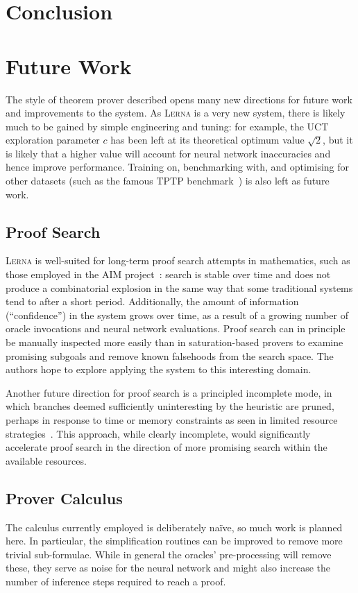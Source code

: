 \documentclass[runningheads]{llncs}
\newcommand{\lerna}{\textsc{Lerna}}
\begin{document}
\section{Conclusion}
\section{Future Work}
The style of theorem prover described opens many new directions for future work and improvements to the system.
As \lerna{} is a very new system, there is likely much to be gained by simple engineering and tuning: for example, the UCT exploration parameter \(c\) has been left at its theoretical optimum value \(\sqrt{2}\), but it is likely that a higher value will account for neural network inaccuracies and hence improve performance.
Training on, benchmarking with, and optimising for other datasets (such as the famous TPTP benchmark~\cite{TPTP}) is also left as future work.

\subsection{Proof Search}
\lerna{} is well-suited for long-term proof search attempts in mathematics, such as those employed in the AIM project~\cite{AIM}: search is stable over time and does not produce a combinatorial explosion in the same way that some traditional systems tend to after a short period.
Additionally, the amount of information (``confidence'') in the system grows over time, as a result of a growing number of oracle invocations and neural network evaluations.
Proof search can in principle be manually inspected more easily than in saturation-based provers to examine promising subgoals and remove known falsehoods from the search space.
The authors hope to explore applying the system to this interesting domain.

Another future direction for proof search is a principled incomplete mode, in which branches deemed sufficiently uninteresting by the heuristic are pruned, perhaps in response to time or memory constraints as seen in limited resource strategies~\cite{LRS}.
This approach, while clearly incomplete, would significantly accelerate proof search in the direction of more promising search within the available resources.

\subsection{Prover Calculus}
The calculus currently employed is deliberately na\"ive, so much work is planned here.
In particular, the simplification routines can be improved to remove more trivial sub-formulae.
While in general the oracles' pre-processing will remove these, they serve as noise for the neural network and might also increase the number of inference steps required to reach a proof.
\end{document}
